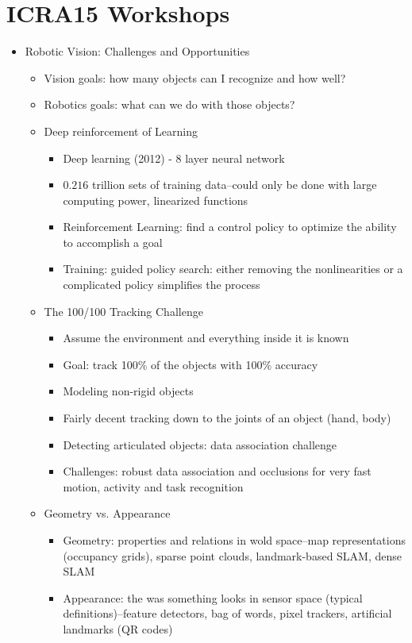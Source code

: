 \documentclass[10pt]{article}
\date{}
\theoremstyle{plain}\theorembodyfont{\normalfont}
\begin{document}
\section*{ICRA15 Workshops}


\begin{itemize}
\item Robotic Vision: Challenges and Opportunities
\begin{itemize}
\item Vision goals: how many objects can I recognize and how well?
\item Robotics goals: what can we do with those objects?
\item Deep reinforcement of Learning
\begin{itemize}
\item Deep learning (2012) - 8 layer neural network
\item $0.216$ trillion sets of training data--could only be done with large computing power, linearized functions
\item Reinforcement Learning: find a control policy to optimize the ability to accomplish a goal
\item Training: guided policy search: either removing the nonlinearities or a complicated policy simplifies the process
\end{itemize}
\item The 100/100 Tracking Challenge
\begin{itemize}
\item Assume the environment and everything inside it is known
\item Goal: track 100\% of the objects with 100\% accuracy
\item Modeling non-rigid objects
\item Fairly decent tracking down to the joints of an object (hand, body)
\item Detecting articulated objects: data association challenge
\item Challenges: robust data association and occlusions for very fast motion, activity and task recognition
\end{itemize}
\item Geometry vs. Appearance
\begin{itemize}
\item Geometry: properties and relations in wold space--map representations (occupancy grids), sparse point clouds, landmark-based SLAM, dense SLAM
\item Appearance: the was something looks in sensor space (typical definitions)--feature detectors, bag of words, pixel trackers, artificial landmarks (QR codes)

\end{itemize}
\end{itemize}
\end{itemize}
\end{document}
